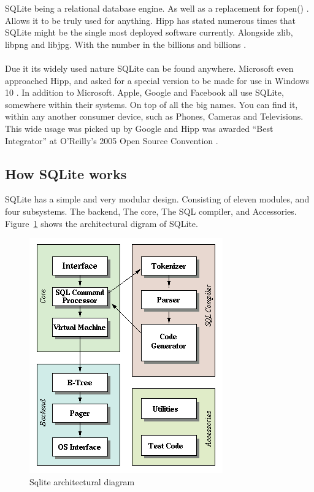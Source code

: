 SQLite being a relational database engine. As well as a replacement for fopen() \citep{sqlite}. Allows it to be truly used for anything. Hipp has stated numerous times that SQLite might be the single most deployed software currently. Alongside zlib, libpng and libjpg. With the number in the billions and billions \citep{sqlite}.
\\\\
Due it its widely used nature SQLite can be found anywhere. Microsoft even approached Hipp, and asked for a special version to be made for use in Windows 10 \citep{sqlitetalk}. In addition to Microsoft. Apple, Google and Facebook all use SQLite, somewhere within their systems. On top of all the big names. You can find it, within any another consumer device, such as Phones, Cameras and Televisions. This wide usage was picked up by Google and Hipp was awarded “Best Integrator” at O’Reilly’s 2005 Open Source Convention \citep{sqlitedefguide}. 

\subsection{How SQLite works}
\label{subsec:how_sqlite_works}

SQLite has a simple and very modular design. Consisting of eleven modules, and four subsystems. The backend, The core, The SQL compiler, and Accessories. Figure~\ref{fig:sqlite_arch} shows the architectural digram of SQLite.

\begin{figure}[H]
	\centering
	\includegraphics[scale=0.50]{images/sqlite_arch.png}
	\caption{Sqlite architectural diagram \citep{sqlite}}
	\label{fig:sqlite_arch}
\end{figure}

